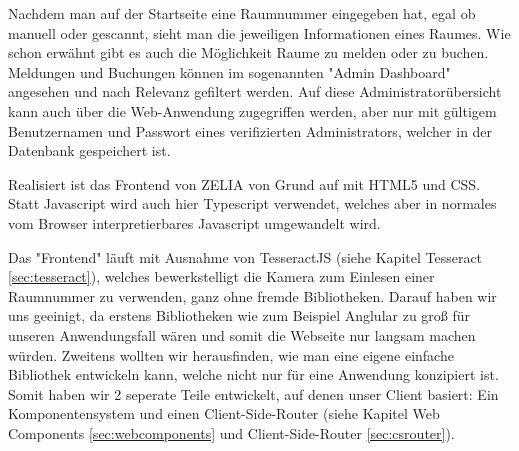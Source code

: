 Nachdem man auf der Startseite eine Raumnummer eingegeben hat, egal ob manuell oder gescannt, sieht man die jeweiligen Informationen eines Raumes. Wie schon erwähnt gibt es auch die Möglichkeit Raume zu melden oder zu buchen. Meldungen und Buchungen können im sogenannten "Admin Dashboard" angesehen und nach Relevanz gefiltert werden. Auf diese Administratorübersicht kann auch über die Web-Anwendung zugegriffen werden, aber nur mit gültigem Benutzernamen und Passwort eines verifizierten Administrators, welcher in der Datenbank gespeichert ist.

Realisiert ist das Frontend von ZELIA von Grund auf mit HTML5 und CSS. Statt Javascript wird auch hier Typescript verwendet, welches aber in normales vom Browser interpretierbares Javascript umgewandelt wird. 

Das "Frontend" läuft mit Ausnahme von TesseractJS (siehe Kapitel Tesseract \ref{sec:tesseract}), welches bewerkstelligt die Kamera zum Einlesen einer Raumnummer zu verwenden, ganz ohne fremde Bibliotheken. Darauf haben wir uns geeinigt, da erstens Bibliotheken wie zum Beispiel Anglular zu groß für unseren Anwendungsfall wären und somit die Webseite nur langsam machen würden. Zweitens wollten wir herausfinden, wie man eine eigene einfache Bibliothek entwickeln kann, welche nicht nur für eine Anwendung konzipiert ist. Somit haben wir 2 seperate Teile entwickelt, auf denen unser Client basiert: Ein Komponentensystem und einen Client-Side-Router (siehe Kapitel Web Components \ref{sec:webcomponents} und Client-Side-Router \ref{sec:csrouter}).